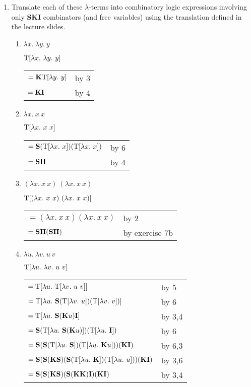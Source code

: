 \documentclass[11pt]{report}
\begin{document}
\begin{enumerate}
\item Translate each of these $\lambda$-terms into combinatory logic expressions involving only \textbf{SKI} combinators (and free variables) using the translation defined in the lecture slides.

	\begin{enumerate}
		\item 
		
		$\lambda x. \ \lambda y. \ y$
		
			$\nt[\lambda x. \ \lambda y. \ y]$
			
			\begin{tabular}{l c}
				$= \textbf{K}\textnormal{T}[\lambda y. \ y]$ & by 3 \\
				$= \textbf{K}\textbf{I}$	 & by 4		
			\end{tabular}		

		\item $\lambda x. \ x \ x$
		
			$\textnormal{T}[\lambda x. \ x \ x]$
			
			\begin{tabular}{l c}
				$= \textbf{S}(\textnormal{T}[\lambda x. \ x])(\textnormal{T}[\lambda x. \ x])$ & by 6 \\
				$=\textbf{S}\textbf{I}\textbf{I}$ & by 4	
			\end{tabular}		
		
		\newpage
		\item $(\lambda x. \ x \ x) \ (\lambda x. \ x \ x)$
		
			$\textnormal{T}[(\lambda x. \ x \ x) \ (\lambda x. \ x \ x)]$
			
			\begin{tabular}{l l}
				$= (\lambda x. \ x \ x)(\lambda x. \ x \ x)$ & by 2 \\
				$= \textbf{S}\textbf{I}\textbf{I}(\textbf{S}\textbf{I}\textbf{I})$ & by exercise 7b
			\end{tabular}				
	
		\item $\lambda u . \ \lambda v. \ u \ v$
		
			$\nt[\lambda u . \ \lambda v. \ u \ v]$
			
			\begin{tabular}{l l}
				$= \textnormal{T}[\lambda u. \ \textnormal{T}[\lambda v. \ u \ v]]$ & by 5\\
				$= \textnormal{T}[\lambda u. \ \textbf{S}(\textnormal{T}[\lambda v. \ u])(\textnormal{T}[\lambda v. \ v])]$ & by 6 \\
				$= \textnormal{T}[\lambda u. \ \textbf{S}(\textbf{K} u)\textbf{I}]$ & by 3,4 \\
				$= \textbf{S}(\textnormal{T}[\lambda u. \ \textbf{S}(\textbf{K} u)])(\textnormal{T}[\lambda u. \ \textbf{I}])$ & by 6 \\
				$= \textbf{S}(\textbf{S}(\textnormal{T}[\lambda u. \ \textbf{S}])(\textnormal{T}[\lambda u. \ \textbf{K} u]))(\textbf{K}\textbf{I})$ & by 6,3 \\
				$= \cS(\cS(\cK\cS)(\cS(\nt[\lambda u. \ \cK])(\nt[\lambda u. \ u]))(\cK\cI)$ & by 3,6 \\
				$= \textbf{S}(\textbf{S}(\textbf{K}\textbf{S})(\textbf{S}(\textbf{K}\textbf{K})\textbf{I})(\textbf{K}\textbf{I})$ & by 3,4				
			\end{tabular}	
			

\end{enumerate}
\end{enumerate}
\end{document}
